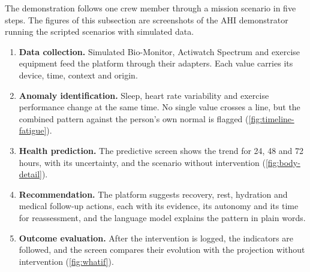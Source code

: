 The demonstration follows one crew member through a mission scenario in five steps. The figures of this subsection are screenshots of the AHI demonstrator running the scripted scenarios with simulated data.

\begin{enumerate}
\item \textbf{Data collection.} Simulated Bio-Monitor, Actiwatch Spectrum and exercise equipment feed the platform through their adapters. Each value carries its device, time, context and origin.
\item \textbf{Anomaly identification.} Sleep, heart rate variability and exercise performance change at the same time. No single value crosses a line, but the combined pattern against the person's own normal is flagged (\ref{fig:timeline-fatigue}).
\item \textbf{Health prediction.} The predictive screen shows the trend for 24, 48 and 72 hours, with its uncertainty, and the scenario without intervention (\ref{fig:body-detail}).
\item \textbf{Recommendation.} The platform suggests recovery, rest, hydration and medical follow-up actions, each with its evidence, its autonomy and its time for reassessment, and the language model explains the pattern in plain words.
\item \textbf{Outcome evaluation.} After the intervention is logged, the indicators are followed, and the screen compares their evolution with the projection without intervention (\ref{fig:whatif}).
\end{enumerate}



